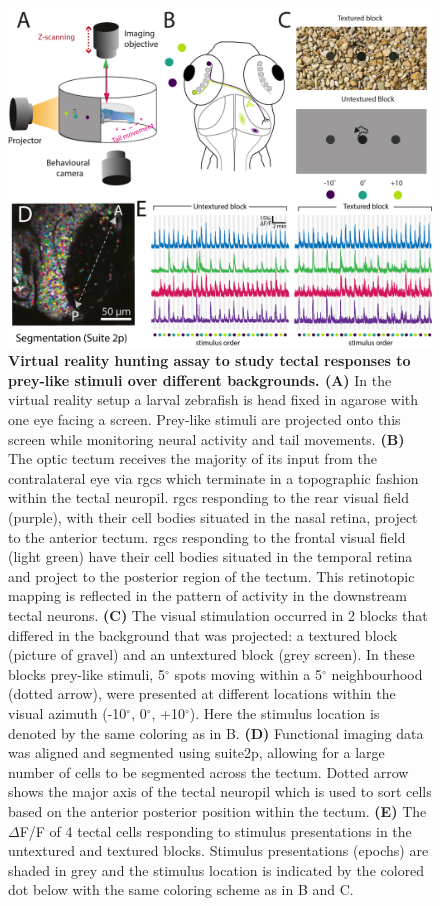 \begin{figure}[!ht]
        \captionsetup{}
        \centering
        \includegraphics[width =  0.75\paperwidth]{Figures/R3_F1.jpg}
       \caption[\label{fig:R3_F1} \textbf{Virtual reality hunting assay to study tectal responses to prey-like stimuli over different backgrounds.}]{\label{fig:R3_F1} \textbf{Virtual reality hunting assay to study tectal responses to prey-like stimuli over different backgrounds. (A)} In the virtual reality setup a larval zebrafish is head fixed in agarose with one eye facing a screen. Prey-like stimuli are projected onto this screen while monitoring neural activity and tail movements. \textbf{(B)} The optic tectum receives the majority of its input from the contralateral eye via \gls{rgc}s which terminate in a topographic fashion within the tectal neuropil. \gls{rgc}s responding to the rear visual field (purple), with their cell bodies situated in the nasal retina, project to the anterior tectum. \gls{rgc}s responding to the frontal visual field (light green) have their cell bodies situated in the temporal retina and project to the posterior region of the tectum. This retinotopic mapping is reflected in the pattern of activity in the downstream tectal neurons. \textbf{(C)} The visual stimulation occurred in 2 blocks that differed in the background that was projected: a textured block (picture of gravel) and an untextured block (grey screen). In these blocks prey-like stimuli, 5$^{\circ}$ spots moving within a 5$^{\circ}$ neighbourhood (dotted arrow), were presented at different locations within the visual azimuth (-10$^{\circ}$, 0$^{\circ}$, +10$^{\circ}$). Here the stimulus location is denoted by the same coloring as in B. \textbf{(D)} Functional imaging data was aligned and segmented using suite2p, allowing for a large number of cells to be segmented across the tectum. Dotted arrow shows the major axis of the tectal neuropil which is used to sort cells based on the anterior posterior position within the tectum. \textbf{(E)} The $\Delta$F/F of 4 tectal cells responding to stimulus presentations in the untextured and textured blocks. Stimulus presentations (epochs) are shaded in grey and the stimulus location is indicated by the colored dot below with the same coloring scheme as in B and C.
    }
\end{figure}


